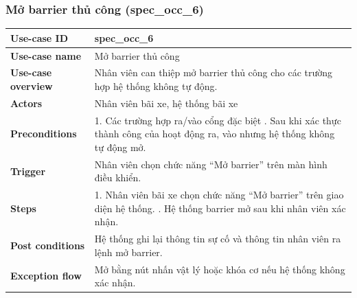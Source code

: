 \subsubsection{Mở barrier thủ công (spec\_occ\_6)}
\begingroup
\small
\begin{longtable}{|>{\centering\arraybackslash}m{3cm}|m{13.7cm}|}
\hline
\textbf{Use-case ID} & spec\_occ\_6  \\ \hline
\textbf{Use-case name} & Mở barrier thủ công   \\ \hline
\textbf{Use-case overview} & Nhân viên can thiệp mở barrier thủ công cho các trường hợp hệ thống không tự động. \\ \hline
\textbf{Actors} & Nhân viên bãi xe, hệ thống bãi xe   \\ \hline
\textbf{Preconditions} &
1. Các trường hợp ra/vào cổng đặc biệt \newline
2. Sau khi xác thực thành công của hoạt động ra, vào nhưng hệ thống không tự động mở.
\\ \hline
\textbf{Trigger} & Nhân viên chọn chức năng “Mở barrier” trên màn hình điều khiển. \\ \hline
\textbf{Steps} & 
1. Nhân viên bãi xe chọn chức năng “Mở barrier” trên giao diện hệ thống. \newline
2. Hệ thống barrier mở sau khi nhân viên xác nhận. \\ \hline
\textbf{Post conditions} & Hệ thống ghi lại thông tin sự cố và thông tin nhân viên ra lệnh mở barrier. \\ \hline
\textbf{Exception flow} & Mở bằng nút nhấn vật lý hoặc khóa cơ nếu hệ thống không xác nhận. \\ \hline
\end{longtable}
\endgroup
